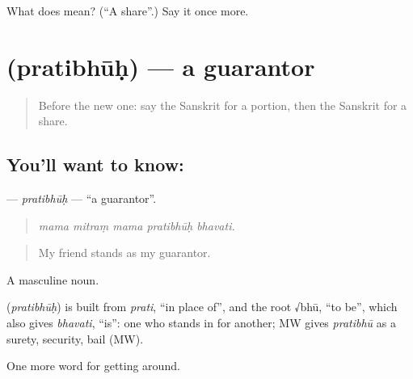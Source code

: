 \begin{tcolorbox}[breakable,colback=teal!4,colframe=teal!35!black,title={Before you move on}]
What does  mean? (\textquotedblleft{}A share\textquotedblright{}.) Say it once more.
\end{tcolorbox}
\section[\texorpdfstring{\sk{प्रतिभूः} (pratibhūḥ)}{प्रतिभूः (pratibhūḥ)}]{ (pratibhūḥ) — a guarantor}

\label{lesson:SA-C433-pratibhuh}



\begin{quote}
Before the new one: say the Sanskrit for a portion, then the Sanskrit for a share.
\end{quote}

\subsection*{You'll want to know: }
\textbf{} — \emph{pratibhūḥ} — \textquotedblleft{}a guarantor\textquotedblright{}.

\begin{quote}
    
\end{quote}

\begin{quote}
\emph{mama mitraṃ mama pratibhūḥ bhavati.}
\end{quote}

\begin{quote}
My friend stands as my guarantor.
\end{quote}

A masculine noun.

\begin{cousinweb}
\textbf{} (\emph{pratibhūḥ}) is built from \emph{prati}, \textquotedblleft{}in place of\textquotedblright{}, and the root √bhū, \textquotedblleft{}to be\textquotedblright{}, which also gives \emph{bhavati}, \textquotedblleft{}is\textquotedblright{}: one who stands in for another; MW gives \emph{pratibhū} as a surety, security, bail (MW).
\end{cousinweb}

\begin{grammarlens}[title={What you've built}]
One more word for getting around.
\end{grammarlens}

